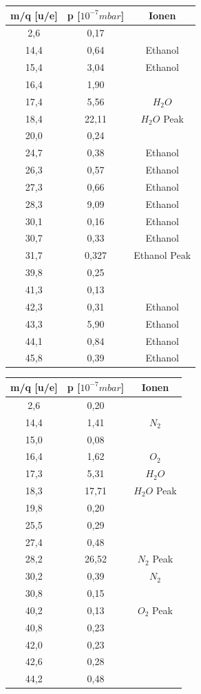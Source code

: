 \begin{center}
\begin{tabular}{c|c|c}
m/q [u/e] & p [$10^{-7} mbar$] & Ionen\\	
\hline	
2,6 &	0,17 &\\
14,4 &	0,64 & Ethanol\\
15,4 &	3,04 & Ethanol\\
16,4 &	1,90 &\\
17,4 &	5,56 & $H_2O$\\
18,4 &	22,11 & $H_2O$ Peak\\
20,0 &	0,24 &\\
24,7 &	0,38 & Ethanol\\
26,3 &	0,57 & Ethanol\\
27,3 &	0,66 & Ethanol\\
28,3 &	9,09 & Ethanol\\
30,1 &	0,16 & Ethanol\\
30,7 &	0,33 & Ethanol\\
31,7 &	0,327 & Ethanol Peak\\
39,8 &	0,25 &\\
41,3 &	0,13 &\\
42,3 &	0,31 & Ethanol\\
43,3 &	5,90 & Ethanol\\
44,1 &	0,84 & Ethanol\\
45,8 &	0,39 & Ethanol\\
\end{tabular}
\end{center}


\begin{center}
\begin{tabular}{c|c|c}
m/q [u/e] & p [$10^{-7} mbar$] & Ionen\\	
\hline	
2,6 &	0,20 &\\
14,4 &	1,41 & $N_2$\\
15,0 &	0,08 &\\
16,4 &	1,62 & $O_2$\\
17,3 &	5,31 & $H_2O$\\
18,3 &	17,71 & $H_2O$ Peak\\
19,8 &	0,20 &\\
25,5 &	0,29 &\\
27,4 &	0,48 &\\
28,2 &	26,52 & $N_2$ Peak\\
30,2 &	0,39 & $N_2$\\
30,8 &	0,15 &\\
40,2 &	0,13 & $O_2$ Peak\\
40,8 &	0,23 &\\
42,0 &	0,23 &\\
42,6 &	0,28 &\\
44,2 &	0,48 &\\
\end{tabular}
\end{center}


